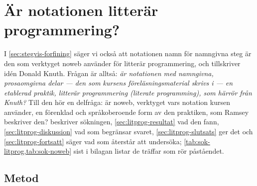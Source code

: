 


\chapter{Är notationen litterär programmering?}
\label{app:literate-programming}

I \cref{sec:stegvis-forfining} säger vi också att notationen \LA{}namn\RA{}
för namngivna steg är den som verktyget noweb använder för litterär
programmering, och tillskriver idén Donald Knuth\autocite{knuth1984}.
Frågan är alltså: \emph{är notationen med namngivna, prosaomgivna delar
--- den som kursens föreläsningsmaterial skrivs i --- en etablerad
praktik, litterär programmering (\foreignlanguage{english}{literate
programming}), som härrör från Knuth?}  Till den hör en delfråga: är
noweb, verktyget vars notation kursen använder, en förenklad och
språkoberoende form av den praktiken, som Ramsey beskriver
den\autocite{Ramsey1994Noweb}?   beskriver
sökningen, \cref{sec:litprog-resultat} vad den fann,
\cref{sec:litprog-diskussion} vad som begränsar svaret,
\cref{sec:litprog-slutsats} ger det och \cref{sec:litprog-fortsatt}
säger vad som återstår att undersöka;
\cref{tab:sok-litprog,tab:sok-noweb} sist i bilagan listar de träffar
som rör påståendet.

\section{Metod}
\label{sec:litprog-metod}

